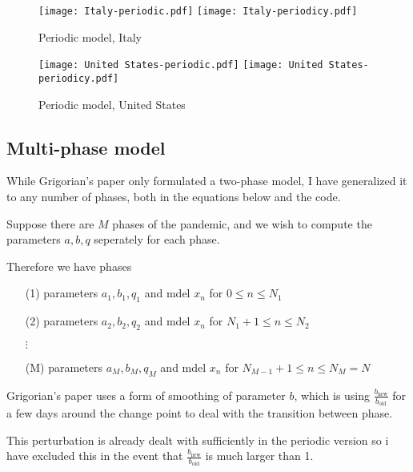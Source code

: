 \begin{figure}[H]
  \texttt{[image: Italy-periodic.pdf]} \label{fig:italy-periodic}
\endminipage\hfill
{}
  \texttt{[image: Italy-periodicy.pdf]} \label{fig:italy-periodicy}
\endminipage
\caption{Periodic model, Italy}
\end{figure}

\begin{figure}[H]
  \texttt{[image: United States-periodic.pdf]} \label{fig:usa-periodic}
\endminipage\hfill
{}
  \texttt{[image: United States-periodicy.pdf]} \label{fig:usa-periodicy}
\endminipage
\caption{Periodic model, United States}
\end{figure}

\subsection{Multi-phase model}

While Grigorian's paper only formulated a two-phase model, I have generalized it to any number of phases, both in the equations below and the code.

Suppose there are $M$ phases of the pandemic, and we wish to compute the parameters $a,b,q$ seperately for each phase.

Therefore we have phases

\begin{itemize}
\item[(1)] parameters $a_1,b_1,q_1$ and mdel $x_n$ for $0\leq n \leq N_1$
\item[(2)]  parameters $a_2,b_2,q_2$ and mdel $x_n$ for $N_1+1\leq n \leq N_2$

$\vdots$

\item[(M)] parameters $a_M,b_M,q_M$ and mdel $x_n$ for $N_{M-1}+1\leq n \leq N_M = N$
\end{itemize}

Grigorian's paper uses a form of smoothing of parameter $b$, which is using $\frac{b_{\text{new}}}{b_{\text{old}}}$ for a few days around the change point to deal with the transition between phase.

This perturbation is already dealt with sufficiently in the periodic version so i have excluded this in the event that  $\frac{b_{\text{new}}}{b_{\text{old}}}$ is much larger than 1. 

